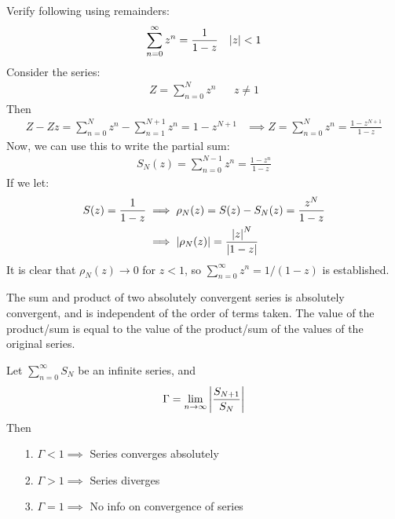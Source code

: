 \documentclass[12pt, english]{book}
\begin{document}
	\begin{example}
		\label{Infinite sum of z^n and remainder for partial sum Example - Complex}
		Verify following using remainders:
		\begin{align*}
			\sum_{n=0}^{\infty} z^n &= \frac{1}{1-z} & \abs{z} < 1
		\end{align*}
		Consider the series:
		\begin{align*}
			Z = \sum_{n=0}^{N} z^n && z \neq 1
		\end{align*}
		Then
		\begin{align*}
			Z - Zz =  \sum_{n=0}^{N} z^n - \sum_{n=1}^{N+1} z^n = 1 - z^{N+1}
			&\implies Z = \sum_{n=0}^{N} z^n = \frac{1-z^{N+1}}{1-z}
		\end{align*}
		Now, we can use this to write the partial sum:
		\begin{align*}
			S_N(z) = \sum_{n=0}^{N-1} z^n = \frac{1-z^n}{1-z}
		\end{align*}
		If we let:
		\begin{align*}
			S(z) = \frac{1}{1-z} 
			&\implies \rho_N(z) = S(z) - S_N(z) = \frac{z^N}{1-z}\\
			&\implies \abs{\rho_N(z)} = \frac{\abs{z}^N}{\abs{1-z}}
		\end{align*}
		It is clear that \(\rho_N(z) \rightarrow 0\) for \(z < 1\), so \(\sum_{n=0}^{\infty} z^n = 1/(1-z)\) is established.
	\end{example}

	\begin{theorem}
		The sum and product of two absolutely convergent series is absolutely convergent, and is independent of the order of terms taken. The value of the product/sum is equal to the value of the product/sum of the values of the original series. 
	\end{theorem}

	\begin{theorem}
		\label{Ratio Test Theorem - Complex}
		Let \(\sum_{n=0}^{\infty} S_N\) be an infinite series, and 
		\begin{align*}
			\Gamma = \lim_{n \rightarrow \infty} \abs{\frac{S_{N+1}}{S_N}}
		\end{align*}
		Then
		\begin{itemize}
			\item[1.] \(\Gamma < 1 \implies \) Series converges absolutely
			\item[2.] \(\Gamma > 1 \implies \) Series diverges
			\item[3.] \(\Gamma = 1 \implies \) No info on convergence of series
		\end{itemize}
	\end{theorem}
\end{document}
